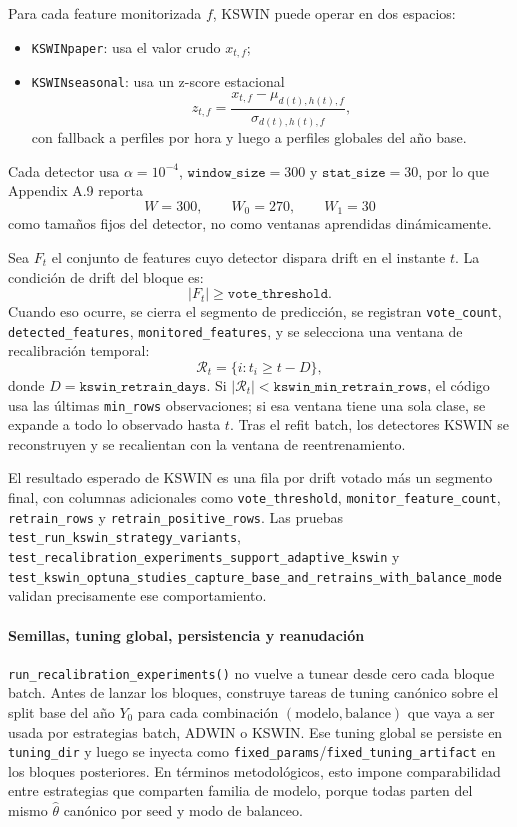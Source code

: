 Para cada feature monitorizada \(f\), KSWIN puede operar en dos espacios:
\begin{itemize}[leftmargin=*]
  \item \texttt{KSWINpaper}: usa el valor crudo \(x_{t,f}\);
  \item \texttt{KSWINseasonal}: usa un z-score estacional
  \[
  z_{t,f} = \frac{x_{t,f} - \mu_{d(t),h(t),f}}{\sigma_{d(t),h(t),f}},
  \]
  con fallback a perfiles por hora y luego a perfiles globales del a\~no base.
\end{itemize}
Cada detector usa \(\alpha = 10^{-4}\), \(\texttt{window\_size}=300\) y \(\texttt{stat\_size}=30\), por lo que Appendix A.9 reporta
\[
W = 300,\qquad W_0 = 270,\qquad W_1 = 30
\]
como tama\~nos fijos del detector, no como ventanas aprendidas din\'amicamente.

Sea \(F_t\) el conjunto de features cuyo detector dispara drift en el instante \(t\). La condici\'on de drift del bloque es:
\[
|F_t| \ge \texttt{vote\_threshold}.
\]
Cuando eso ocurre, se cierra el segmento de predicci\'on, se registran \texttt{vote\_count}, \texttt{detected\_features}, \texttt{monitored\_features}, y se selecciona una ventana de recalibraci\'on temporal:
\[
\mathcal{R}_t = \{i : t_i \ge t - D\},
\]
donde \(D = \texttt{kswin\_retrain\_days}\). Si \(|\mathcal{R}_t| < \texttt{kswin\_min\_retrain\_rows}\), el c\'odigo usa las \'ultimas \texttt{min\_rows} observaciones; si esa ventana tiene una sola clase, se expande a todo lo observado hasta \(t\). Tras el refit batch, los detectores KSWIN se reconstruyen y se recalientan con la ventana de reentrenamiento.

El resultado esperado de KSWIN es una fila por drift votado m\'as un segmento final, con columnas adicionales como \texttt{vote\_threshold}, \texttt{monitor\_feature\_count}, \texttt{retrain\_rows} y \texttt{retrain\_positive\_rows}. Las pruebas \texttt{test\_run\_kswin\_strategy\_variants}, \texttt{test\_recalibration\_experiments\_support\_adaptive\_kswin} y \texttt{test\_kswin\_optuna\_studies\_capture\_base\_and\_retrains\_with\_balance\_mode} validan precisamente ese comportamiento.

\paragraph{Semillas, tuning global, persistencia y reanudaci\'on}
\texttt{run\_recalibration\_experiments()} no vuelve a tunear desde cero cada bloque batch. Antes de lanzar los bloques, construye tareas de tuning can\'onico sobre el split base del a\~no \(Y_0\) para cada combinaci\'on \((\text{modelo}, \text{balance})\) que vaya a ser usada por estrategias batch, ADWIN o KSWIN. Ese tuning global se persiste en \texttt{tuning\_dir} y luego se inyecta como \texttt{fixed\_params}/\texttt{fixed\_tuning\_artifact} en los bloques posteriores. En t\'erminos metodol\'ogicos, esto impone comparabilidad entre estrategias que comparten familia de modelo, porque todas parten del mismo \(\hat{\theta}\) can\'onico por seed y modo de balanceo.

